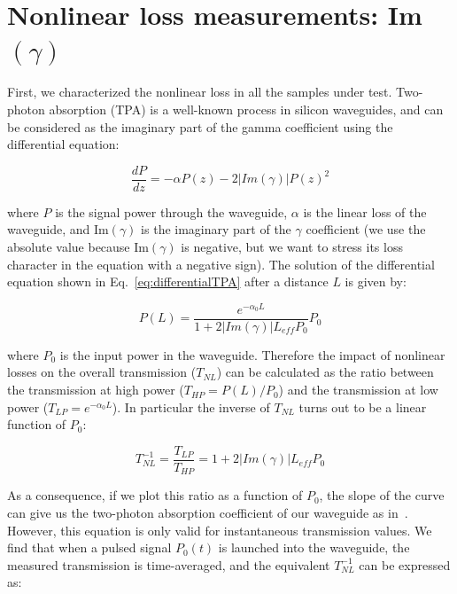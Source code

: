 \documentclass[10pt,letterpaper]{article}
\begin{document}
\section{Nonlinear loss measurements: Im$ (\gamma) $}
\label{sec:imGamma}
First, we characterized the nonlinear loss in all the samples under test.  Two-photon absorption (TPA) is a well-known process in silicon waveguides, and can be considered as the imaginary part of the gamma coefficient using the differential equation:

\begin{equation}
\frac{dP}{dz} = -\alpha P(z) - 2|Im(\gamma)| P(z)^2 
\label{eq:differentialTPA}
\end{equation}

where $P$ is the signal power through the waveguide, $\alpha$ is the linear loss of the waveguide, and Im$(\gamma)$ is the imaginary part of the $\gamma$ coefficient (we use the absolute value because Im$(\gamma)$ is negative, but we want to stress its loss character in the equation with a negative sign). 
The solution of the differential equation shown in Eq.~\ref{eq:differentialTPA} after a distance $L$ is given by:

                                                                \begin{equation}
                                                                         P(L) = \frac{e^{-\alpha_0 L}}{1+2|Im(\gamma)| L_{eff} P_0} P_0
                                                                \end{equation}

where $P_0$ is the input power in the waveguide. Therefore the impact of nonlinear losses on the overall transmission ($T_{NL}$) can be calculated as the ratio between the transmission at high power ($T_{HP} = P(L)/P_0 $) and the transmission at low power ($T_{LP} = e^{-\alpha_0 L} $). In particular the inverse of $T_{NL}$ turns out to be a linear function of $P_0$:

                                                                \begin{equation}
                                                                         T_{NL}^{-1} = \frac{T_{LP}}{T_{HP}} = 1+2|Im(\gamma)| L_{eff} P_0
                                                                        \label{eq:transmissionLinear}
                                                                \end{equation}

As a consequence, if we plot this ratio as a function of $P_0$, the slope of the curve can give us the two-photon absorption coefficient of our waveguide as in~\cite{Vallaitis2009}.
However, this equation is only valid for instantaneous transmission values. We find that when a pulsed signal $P_0(t)$ is launched into the waveguide, the measured transmission is time-averaged, and the equivalent $T_{NL}^{-1}$ can be expressed as:
\end{document}
